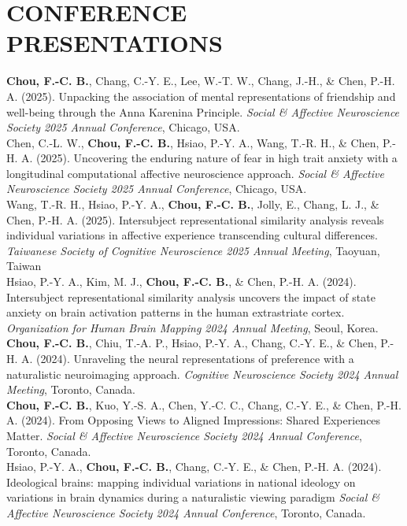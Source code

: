 \documentclass[a4paper,12pt]{article}
\newcommand{\sectionspace}{0pt} %
\newcommand{\itemspace}{7pt} %
\begin{document}
\vspace{\sectionspace}

\section*{CONFERENCE PRESENTATIONS}
\noindent\textbf{Chou, F.-C. B.}, Chang, C.-Y. E., Lee, W.-T. W., Chang, J.-H., \& Chen, P.-H. A. (2025). Unpacking the association of mental representations of friendship and well-being through the Anna Karenina Principle. \textit{Social \& Affective Neuroscience Society 2025 Annual Conference}, Chicago, USA. \\[\itemspace]
\noindent Chen, C.-L. W., \textbf{Chou, F.-C. B.}, Hsiao, P.-Y. A., Wang, T.-R. H., \& Chen, P.-H. A. (2025). Uncovering the enduring nature of fear in high trait anxiety with a longitudinal computational affective neuroscience approach. \textit{Social \& Affective Neuroscience Society 2025 Annual Conference}, Chicago, USA. \\[\itemspace]
\noindent Wang, T.-R. H., Hsiao, P.-Y. A., \textbf{Chou, F.-C. B.}, Jolly, E., Chang, L. J., \& Chen, P.-H. A. (2025). Intersubject representational similarity analysis reveals individual variations in affective experience transcending cultural differences. \textit{Taiwanese Society of Cognitive Neuroscience 2025 Annual Meeting}, Taoyuan, Taiwan\\[\itemspace]
\noindent Hsiao, P.-Y. A., Kim, M. J., \textbf{Chou, F.-C. B.}, \& Chen, P.-H. A. (2024). Intersubject representational similarity analysis uncovers the impact of state anxiety on brain activation patterns in the human extrastriate cortex. \textit{Organization for Human Brain Mapping 2024 Annual Meeting}, Seoul, Korea.\\[\itemspace]
\noindent \textbf{Chou, F.-C. B.}, Chiu, T.-A. P., Hsiao, P.-Y. A., Chang, C.-Y. E., \& Chen, P.-H. A. (2024). Unraveling the neural representations of preference with a naturalistic neuroimaging approach. \textit{Cognitive Neuroscience Society 2024 Annual Meeting}, Toronto, Canada.\\[\itemspace]
\noindent\textbf{Chou, F.-C. B.}, Kuo, Y.-S. A., Chen, Y.-C. C., Chang, C.-Y. E., \& Chen, P.-H. A. (2024). From Opposing Views to Aligned Impressions: Shared Experiences Matter. \textit{Social \& Affective Neuroscience Society 2024 Annual Conference}, Toronto, Canada. \\[\itemspace]
\noindent Hsiao, P.-Y. A., \textbf{Chou, F.-C. B.}, Chang, C.-Y. E., \& Chen, P.-H. A. (2024). Ideological brains: mapping individual variations in national ideology on variations in brain dynamics during a naturalistic viewing paradigm \textit{Social \& Affective Neuroscience Society 2024 Annual Conference}, Toronto, Canada. \\[\itemspace]
\end{document}
